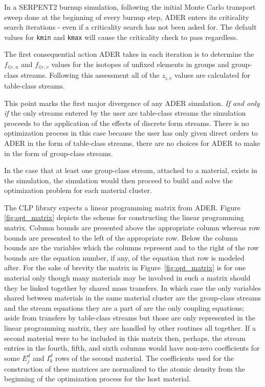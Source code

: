 In a SERPENT2 burnup simulation, following the initial Monte Carlo transport
sweep done at the beginning of every burnup step, ADER enters its criticality
search iterations - even if a criticality search has not been asked for. The
default values for \texttt{kmin} and \texttt{kmax} will cause the criticality
check to pass regardless.

The first consequential action ADER takes in each iteration is to determine
the $f_{i|e,u}$ and $f_{i|e,v}$ values for the isotopes of unfixed elements
in groups and group-class streams. Following this assessment all of the
$z_{i,v}$ values are calculated for table-class streams.

This point marks the first major divergence of any ADER simulation.
\textit{If and only if} the only streams entered by the user are table-class
streams the simulation proceeds to the application of the effects of discrete
form streams. There is no optimization process in this case because the user 
has only given direct orders to ADER in the form of table-class streams, there 
are no choices for ADER to make in the form of group-class streams. 

In the case that at least one group-class stream, attached to a material, exists
in the simulation, the simulation would then proceed to build and solve the
optimization problem for each material cluster.

The CLP library expects a linear programming matrix from ADER.
Figure \ref{fig:opt_matrix}
depicts the scheme for constructing the linear programming matrix. Column bounds
are presented above the appropriate column whereas row bounds are presented to 
the left of the appropriate row. Below the column bounds are the variables which
the columns represent and to the right of the row bounds are the equation
number, if any, of the equation that row is modeled after. 
For the sake of brevity
the matrix in Figure~\ref{fig:opt_matrix} is for one material only though many
materials may be involved in such a matrix should they be linked together
by shared mass transfers. In which case the only variables shared between 
materials in the same material cluster are the
group-class streams and the stream equations they are a part of are the only
coupling equations; aside from transfers by table-class streams but those
are only represented in the linear programming matrix, they are handled by
other routines all together. If a second material were to be included in this
matrix then, perhaps, the stream entries in the fourth, fifth, and sixth 
columns would have non-zero coefficients for some $E_{j}^{d}$ and $I_{k}^{d}$ 
rows of the second material. The coefficients used for the construction of these
matrices are normalized to the atomic density from the beginning of the
optimization process for the host material.

